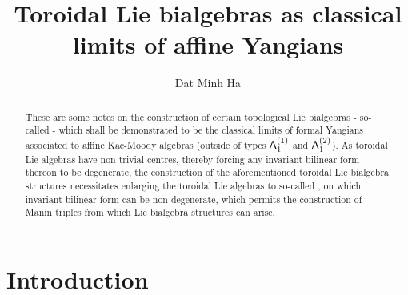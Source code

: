 

\setcounter{section}{-1}





    \title{Toroidal Lie bialgebras as classical limits of affine Yangians}
    
    \author{Dat Minh Ha}
    \maketitle
    
    \begin{abstract}
        These are some notes on the construction of certain topological Lie bialgebras - so-called  - which shall be demonstrated to be the classical limits of formal Yangians associated to affine Kac-Moody algebras (outside of types $\mathsf{A}_1^{(1)}$ and $\mathsf{A}_1^{(2)}$). As toroidal Lie algebras have non-trivial centres, thereby forcing any invariant bilinear form thereon to be degenerate, the construction of the aforementioned toroidal Lie bialgebra structures necessitates enlarging the toroidal Lie algebras to so-called , on which invariant bilinear form can be non-degenerate, which permits the construction of Manin triples from which Lie bialgebra structures can arise.
    \end{abstract}
    
    {
    \hypersetup{} 
    \tableofcontents %
    \listoftodos
    }

    \section{Introduction}

    

    

    
    \begin{appendices}
        
    \end{appendices}
            
    \printbibliography

